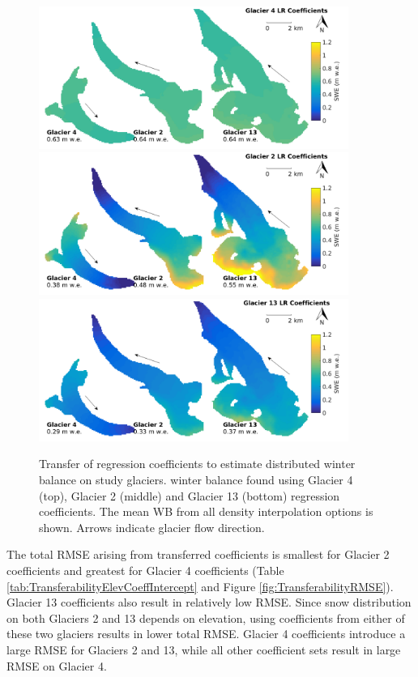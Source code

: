 \documentclass{sfuthesis}
\begin{document}
\begin{figure}[H]
	\centering
	\includegraphics[width =0.9\textwidth]{MapTransferabilityG4Coeffs.png}\\
	\includegraphics[width =0.9\textwidth]{MapTransferabilityG2Coeffs.png}\\
	\includegraphics[width =0.9\textwidth]{MapTransferabilityG13Coeffs.png}\\
	\caption{Transfer of regression coefficients to estimate distributed winter balance on study glaciers. winter balance found using Glacier 4 (top), Glacier 2 (middle) and Glacier 13 (bottom) regression coefficients. The mean WB from all density interpolation options is shown. Arrows indicate glacier flow direction.}
	\label{fig:MapTransferabilityGlaciersMean}
\end{figure}

The total RMSE arising from transferred coefficients is smallest for Glacier 2 coefficients and greatest for Glacier 4 coefficients (Table \ref{tab:TransferabilityElevCoeffIntercept} and Figure \ref{fig:TransferabilityRMSE}). Glacier 13 coefficients also result in relatively low RMSE. Since snow distribution on both Glaciers 2 and 13 depends on elevation, using coefficients from either of these two glaciers results in lower total RMSE. Glacier 4 coefficients introduce a large RMSE for Glaciers 2 and 13, while all other coefficient sets result in large RMSE on Glacier 4. 
\end{document}
